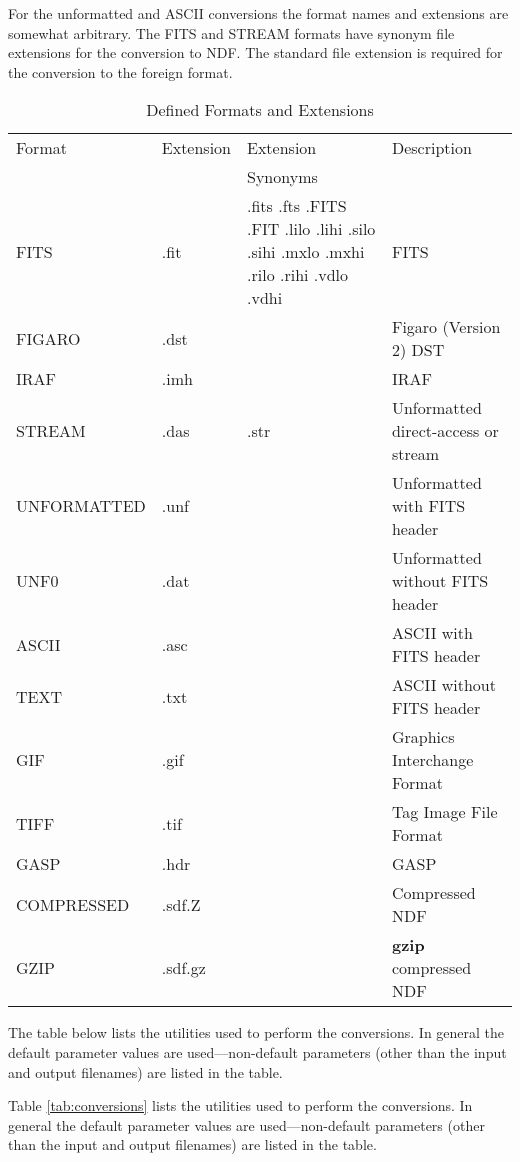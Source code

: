\documentclass[twoside,11pt]{article}
\newenvironment{latexonly}{}{}
\begin{document}
For the unformatted and ASCII conversions the format names and
extensions are somewhat arbitrary.  The FITS and STREAM formats have
synonym file extensions for the conversion to NDF.  The standard file
extension is required for the conversion to the foreign format.

\begin{table}[hb]
\begin{center}
\begin{tabular}{|llp{32mm}l|}
\hline
Format & Extension & Extension & Description \\
       &           & Synonyms  & \\
\hline
FITS        & .fit & .fits .fts .FITS .FIT
                     .lilo .lihi .silo .sihi
                     .mxlo .mxhi .rilo .rihi .vdlo .vdhi & FITS \\
FIGARO      & .dst & & Figaro (Version 2) DST \\
IRAF        & .imh & & IRAF \\
STREAM      & .das & .str & Unformatted direct-access or stream \\
UNFORMATTED & .unf & & Unformatted with FITS header \\
UNF0        & .dat & & Unformatted without FITS header \\
ASCII       & .asc & & ASCII with FITS header \\
TEXT        & .txt & & ASCII without FITS header \\
GIF         & .gif & & Graphics Interchange Format \\
TIFF        & .tif & & Tag Image File Format \\
GASP        & .hdr & & GASP \\
COMPRESSED  & .sdf.Z & & Compressed NDF \\
GZIP        & .sdf.gz & & {\bf gzip} compressed NDF \\
\hline
\end{tabular}
\caption{\label{tab:formats}Defined Formats and Extensions}
\end{center}
\end{table}

\begin{htmlonly}
The table below lists the utilities used to perform the conversions.
In general the default parameter values are used---non-default parameters 
(other than the input and output filenames) are listed in the table.
\end{htmlonly}
\begin{latexonly}
Table \ref{tab:conversions} lists the utilities used to perform the conversions.
In general the default parameter values are used---non-default parameters 
(other than the input and output filenames) are listed in the table.
\end{latexonly}
\end{document}
